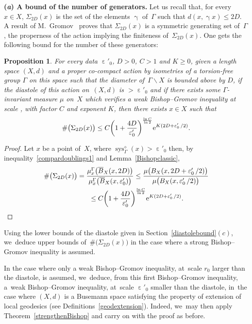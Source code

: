 \documentclass[pdftex]{sigma}
\numberwithin{equation}{section}
\newtheorem{prop}[theor]{Proposition}
\newcommand{\sys}{\operatorname{sys}}
\newcommand{\g}{\operatorname{\gamma}}
\newcommand{\e}{\operatorname{\varepsilon}}
\begin{document}
\medskip\noindent
{\bf (\emph{a}) A bound of the number of generators.}
Let us recall that, for every $x \in X$, $\Sigma_{2 D} (x)$ is the set of
the elements $\g$ of~$\Gamma$ such that $d(x, \g x) \le 2 D$. A result of M.~Gromov~\cite[Proposition~3.22]{Gr1} proves that $\Sigma_{2 D} (x)$ is a symmetric generating set of~$\Gamma $, the properness of
the action implying the finiteness of~$\Sigma_{2 D} (x) $. One gets the following bound for the number of these generators:

\begin{prop}%
For every data $\e'_0$, $D >0$, $C > 1 $ and $K\ge 0$, given a length space
$(X,d)$ and a proper co-compact action by isometries of a torsion-free group
$\Gamma $ on this space such that the diameter of~$\Gamma \backslash X$ is bounded above by $D$, if the diastole of this action
on~$(X,d)$ is $ > \e'_0$ and if there exists some
$\Gamma$-invariant measure $\mu$ on~$X$ which verifies a weak Bishop--Gromov inequality at scale \smash{$\frac{\e'_0}{2}$}, with factor $C$ and exponent $K$, then
there exists $x \in X$ such that
\begin{gather*}
 \# \big( \Sigma_{2 D} (x) \big) \le C \bigg(1 + \dfrac{4 D }{\e'_0}\bigg)^{\frac{\ln C}{\ln 2}} {\rm e}^{K (2 D + \e'_0/2)}.
 \end{gather*}
\end{prop}

\begin{proof}
Let $x$ be a point of~$X$, where $\sys^{\diamond}_\Gamma (x) > \e'_0$ then, by inequality~\eqref{compardoublings1} and Lemma~\ref{Bishopclassic},
\begin{gather*}
\# \big( \Sigma_{2 D} (x) \big) = \dfrac{\mu_{x}^{\Gamma} \big( \overline B_X (x, 2 D) \big)}{\mu_{x}^{\Gamma} \big( \overline B_X (x, \e'_0) \big)} \le \dfrac{\mu \big( B_X (x, 2 D + \e'_0/2) \big)}{\mu \big( B_X (x, \e'_0/2) \big)}
\\ \hphantom{\# \big( \Sigma_{2 D} (x) \big)}
{}\le C \bigg(1 + \dfrac{4 D }{\e'_0}\bigg)^{\frac{\ln C}{\ln 2}} {\rm e}^{K (2 D + \e'_0/2)}.
\tag*{\qed}
\end{gather*}
\renewcommand{\qed}{}
\end{proof}

Using the lower bounds of the diastole given in Section~\ref{diastolebound}$(c)$, we~deduce upper bounds of~$\# \big(\Sigma_{2 D} (x) \big) $ in
the case where a strong Bishop--Gromov inequality is assumed.

In the case where only a weak Bishop--Gromov inequality, at~scale $r_0 $ larger than the diastole, is assumed, we~deduce, from this first Bishop--Gromov inequality, a~weak Bishop--Gromov inequality, at~scale $\e'_0 $ smaller than the diastole, in~the case where $(X,d)$ is a Busemann space satisfying the property of extension of local geodesics (see Definitions~\ref{geodextension}). Indeed, we~may then apply Theorem~\ref{strengthenBishop} and carry on with
the proof as before.
\end{document}
